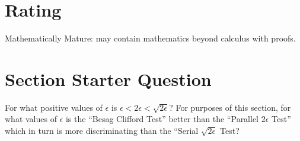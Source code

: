 \documentclass[12pt]{article}
\begin{document}
\myheader \mytitle

\hr


\hr

\usefirefox

\hr



\section*{Rating} %
Mathematically Mature:  may contain mathematics beyond calculus with
proofs. %

\hr

\section*{Section Starter Question} For what positive values of \(
\epsilon \) is \( \epsilon < 2 \epsilon < \sqrt{2 \epsilon} \)?  For
purposes of this section, for what values of \( \epsilon \) is the
``Besag Clifford Test'' better than the ``Parallel \( 2 \epsilon \)
Test'' which in turn is more discriminating than the ``Serial \( \sqrt{2
\epsilon} \) Test?

\hr

\end{document}
